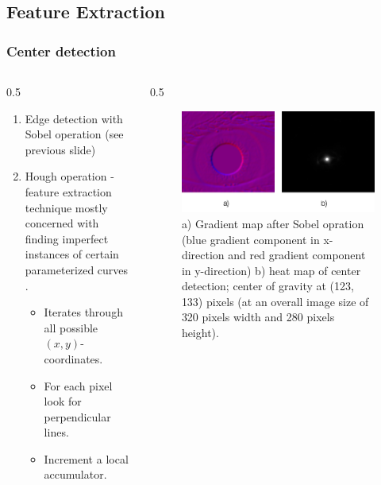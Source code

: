 \documentclass{beamer}
\begin{document}
\subsection{Feature Extraction}
\begin{frame}
    [fragile] \frametitle{Center detection}
    \begin{columns}
        \begin{column}
            {0.5
            \textwidth}
            \begin{enumerate}
                [1.]
                \item Edge detection with Sobel operation (see previous slide)
                \item Hough operation - feature extraction technique mostly concerned with finding imperfect instances of certain parameterized curves \cite{shapiro2001computer}.
                \begin{itemize}
                    \item Iterates through all possible $(x,y)$-coordinates.
                    \item For each pixel look for perpendicular lines.
                    \item Increment a local accumulator.
                \end{itemize}
            \end{enumerate}
        \end{column}
        \begin{column}
            {0.5
            \textwidth}
            \begin{figure}
                [ht] \centering
                \includegraphics[width=0.99
                \textwidth]{../report/iris/sobel_hough.png} \caption{a) Gradient map after Sobel opration (blue gradient component in x-direction and red gradient component in y-direction) b) heat map of center detection; center of gravity at (123, 133) pixels (at an overall image size of 320 pixels width and 280 pixels height).} \label{fig:sobel_hough}
            \end{figure}
        \end{column}
    \end{columns}
\end{frame}
\end{document}
